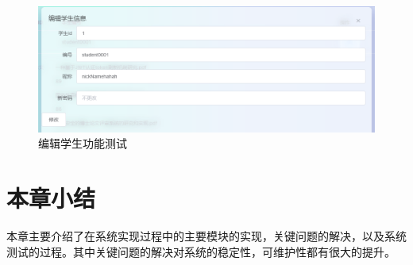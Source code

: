 \begin{figure}[H]
  \centering
  \includegraphics[scale = 0.6]{out/figure/测试/manage-edit-student-test.png}
  \caption{\song\wuhao 编辑学生功能测试}
  \label{manage-edit-student-test}
\end{figure}

\section{本章小结}

本章主要介绍了在系统实现过程中的主要模块的实现，关键问题的解决，以及系统测试的过程。其中关键问题的解决对系统的稳定性，可维护性都有很大的提升。